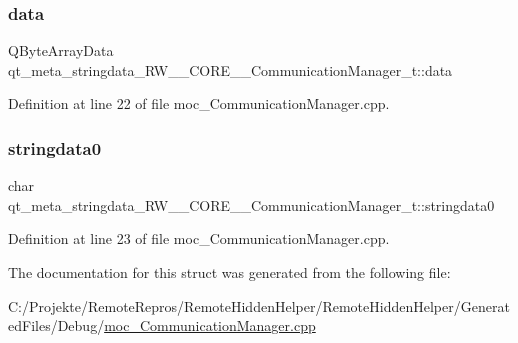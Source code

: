 \subsubsection{\texorpdfstring{data}{data}}
{\footnotesize\ttfamily Q\+Byte\+Array\+Data qt\+\_\+meta\+\_\+stringdata\+\_\+\+R\+W\+\_\+\+\_\+\+C\+O\+R\+E\+\_\+\+\_\+\+Communication\+Manager\+\_\+t\+::data}



Definition at line 22 of file moc\+\_\+\+Communication\+Manager.\+cpp.

\hypertarget{structqt__meta__stringdata___r_w_____c_o_r_e_____communication_manager__t_a40ff55b6d2465185cd2cf354e48c98d2}{}\label{structqt__meta__stringdata___r_w_____c_o_r_e_____communication_manager__t_a40ff55b6d2465185cd2cf354e48c98d2} 
\subsubsection{\texorpdfstring{stringdata0}{stringdata0}}
{\footnotesize\ttfamily char qt\+\_\+meta\+\_\+stringdata\+\_\+\+R\+W\+\_\+\+\_\+\+C\+O\+R\+E\+\_\+\+\_\+\+Communication\+Manager\+\_\+t\+::stringdata0}



Definition at line 23 of file moc\+\_\+\+Communication\+Manager.\+cpp.



The documentation for this struct was generated from the following file\+:\begin{DoxyCompactItemize}
\item 
C\+:/\+Projekte/\+Remote\+Repros/\+Remote\+Hidden\+Helper/\+Remote\+Hidden\+Helper/\+Generated\+Files/\+Debug/\hyperlink{_debug_2moc___communication_manager_8cpp}{moc\+\_\+\+Communication\+Manager.\+cpp}\end{DoxyCompactItemize}
